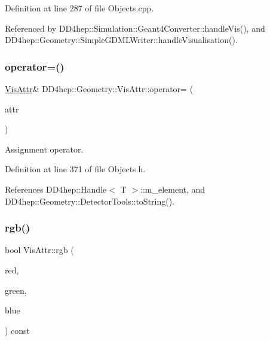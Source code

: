 Definition at line 287 of file Objects.\+cpp.



Referenced by D\+D4hep\+::\+Simulation\+::\+Geant4\+Converter\+::handle\+Vis(), and D\+D4hep\+::\+Geometry\+::\+Simple\+G\+D\+M\+L\+Writer\+::handle\+Visualisation().

\hypertarget{class_d_d4hep_1_1_geometry_1_1_vis_attr_a02a672b6dc4e30bb7208960a7a54f2ac}{}\label{class_d_d4hep_1_1_geometry_1_1_vis_attr_a02a672b6dc4e30bb7208960a7a54f2ac} 
\subsubsection{\texorpdfstring{operator=()}{operator=()}}
{\footnotesize\ttfamily \hyperlink{class_d_d4hep_1_1_geometry_1_1_vis_attr}{Vis\+Attr}\& D\+D4hep\+::\+Geometry\+::\+Vis\+Attr\+::operator= (\begin{DoxyParamCaption}\item[{const \hyperlink{class_d_d4hep_1_1_geometry_1_1_vis_attr}{Vis\+Attr} \&}]{attr }\end{DoxyParamCaption})\hspace{0.3cm}{\ttfamily [inline]}}



Assignment operator. 



Definition at line 371 of file Objects.\+h.



References D\+D4hep\+::\+Handle$<$ T $>$\+::m\+\_\+element, and D\+D4hep\+::\+Geometry\+::\+Detector\+Tools\+::to\+String().

\hypertarget{class_d_d4hep_1_1_geometry_1_1_vis_attr_aa58eeb502a6bc084de091590930e7827}{}\label{class_d_d4hep_1_1_geometry_1_1_vis_attr_aa58eeb502a6bc084de091590930e7827} 
\subsubsection{\texorpdfstring{rgb()}{rgb()}}
{\footnotesize\ttfamily bool Vis\+Attr\+::rgb (\begin{DoxyParamCaption}\item[{float \&}]{red,  }\item[{float \&}]{green,  }\item[{float \&}]{blue }\end{DoxyParamCaption}) const}



